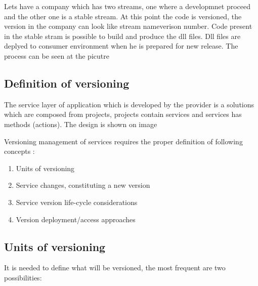 Lets have a company which has two streams, one where a developmnet proceed and the other one is a stable stream. At this point the code is versioned, the version in the company can look like {stream name}{verison number}. Code present in the stable stram is possible to build and produce the dll files. Dll files are deplyed to consumer environment when he is prepared for new release. The process can be seen at the picutre %

\subsection{Definition of versioning}

The service layer of application which is developed by the provider is a solutions which are composed from projects, projects contain services and services has methods (actions). The design is shown on image %


\bigskip 

Versioning management of services requires the proper definition of following concepts \cite{website:versioning-in-soa}:
\begin{enumerate}
  \item Units of versioning
  \item Service changes, constituting a new version
  \item Service version life-cycle considerations
  \item Version deployment/access approaches
\end{enumerate}

\subsection{Units of versioning}
It is needed to define what will be versioned, the most frequent are two possibilities:

